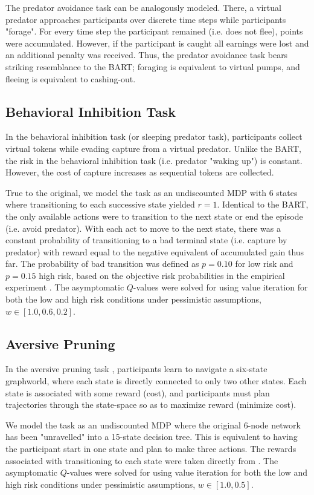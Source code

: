 \documentclass[manuscript]{stjour}
\begin{document}
The predator avoidance task \citep{fung2019} can be analogously modeled. There, a virtual predator approaches participants over discrete time steps while participants "forage". For every time step the participant remained (i.e. does not flee), points were accumulated. However, if the participant is caught all earnings were lost and an additional penalty was received. Thus, the predator avoidance task bears striking resemblance to the BART; foraging is equivalent to virtual pumps, and fleeing is equivalent to cashing-out.

\subsection{Behavioral Inhibition Task}
In the behavioral inhibition task \citep{bach2015} (or sleeping predator task), participants collect virtual tokens while evading capture from a virtual predator. Unlike the BART, the risk in the behavioral inhibition task (i.e. predator "waking up") is constant. However, the cost of capture increases as sequential tokens are collected.

True to the original, we model the task as an undiscounted MDP with 6 states where transitioning to each successive state yielded $r=1$. Identical to the BART, the only available actions were to transition to the next state or end the episode (i.e. avoid predator). With each act to move to the next state, there was a constant probability of transitioning to a bad terminal state (i.e. capture by predator) with reward equal to the negative equivalent of accumulated gain thus far. The probability of bad transition was defined as $p = 0.10$ for low risk and $p = 0.15$ high risk, based on the objective risk probabilities in the empirical experiment \citep{bach2015}. The asymptomatic $Q$-values were solved for using value iteration for both the low and high risk conditions under pessimistic assumptions, $w \in [1.0, 0.6, 0.2]$.

\subsection{Aversive Pruning}
In the aversive pruning task \citep{Huys2012, Lally2017}, participants learn to navigate a six-state graphworld, where each state is directly connected to only two other states. Each state is associated with some reward (cost), and participants must plan trajectories through the state-space so as to maximize reward (minimize cost). 

We model the task as an undiscounted MDP where the original 6-node network has been "unravelled" into a 15-state decision tree. This is equivalent to having the participant start in one state and plan to make three actions. The rewards associated with transitioning to each state were taken directly from \citep{Huys2012, Lally2017}. The asymptomatic $Q$-values were solved for using value iteration for both the low and high risk conditions under pessimistic assumptions, $w \in [1.0, 0.5]$.
\end{document}

